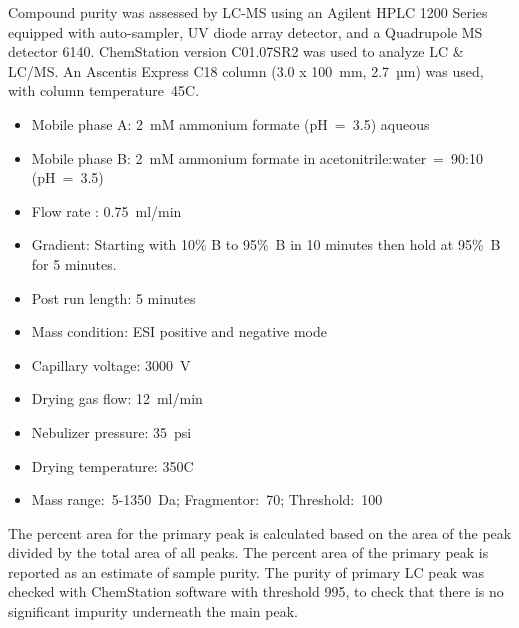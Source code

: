 \documentclass[9pt,lineno]{elife}
\begin{document}
Compound purity was assessed by LC-MS using an Agilent HPLC 1200 Series equipped with auto-sampler, UV diode array detector, and a Quadrupole MS detector 6140. 
ChemStation version C01.07SR2 was used to analyze LC \& LC/MS.
An Ascentis Express C18 column (3.0 x 100~mm, 2.7~µm) was used, with column temperature~45\textdegree C.
\begin{itemize}
\item Mobile phase A: 2~mM ammonium formate (pH~=~3.5) aqueous
\item Mobile phase B: 2~mM ammonium formate in acetonitrile:water~=~90:10 (pH~=~3.5)
\item Flow rate : 0.75~ml/min
\item Gradient: Starting with 10\% B to 95\%~B in 10 minutes then hold at 95\%~B for 5 minutes. 
\item Post run length: 5 minutes 
\item Mass condition: ESI positive and negative mode
\item Capillary voltage: 3000~V
\item Drying gas flow: 12~ml/min
\item Nebulizer pressure: 35~psi
\item Drying temperature: 350\textdegree C
\item Mass range:~5-1350~Da; Fragmentor:~70; Threshold:~100
\end{itemize}

The percent area for the primary peak is calculated based on the area of the peak divided by the total area of all peaks. 
The percent area of the primary peak is reported as an estimate of sample purity. 
The purity of primary LC peak was checked with ChemStation software with threshold 995, to check that there is no significant impurity underneath the main peak. 
\end{document}
